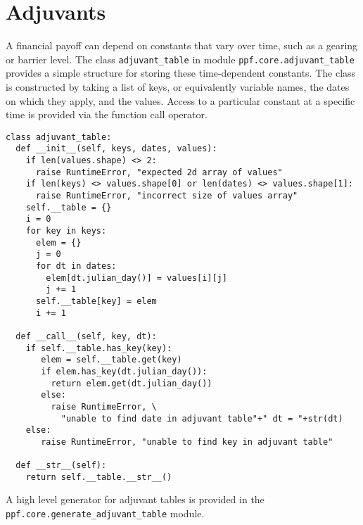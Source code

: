 \section{Adjuvants}\label{sec:adjuvant-tables}
A financial payoff can depend on constants that vary over time, such
as a gearing or barrier level. The class \verb|adjuvant_table| in
module \verb|ppf.core.adjuvant_table| provides a simple structure for
storing these time-dependent constants. The class is constructed by
taking a list of keys, or equivalently variable names, the dates on
which they apply, and the values. Access to a particular constant at a
specific time is provided via the function call operator.
\begin{verbatim}
class adjuvant_table:
  def __init__(self, keys, dates, values):
    if len(values.shape) <> 2:
      raise RuntimeError, "expected 2d array of values"
    if len(keys) <> values.shape[0] or len(dates) <> values.shape[1]:
      raise RuntimeError, "incorrect size of values array"
    self.__table = {}
    i = 0
    for key in keys:
      elem = {}
      j = 0
      for dt in dates:        
        elem[dt.julian_day()] = values[i][j]
        j += 1
      self.__table[key] = elem
      i += 1

  def __call__(self, key, dt):
    if self.__table.has_key(key):
       elem = self.__table.get(key)
       if elem.has_key(dt.julian_day()):
         return elem.get(dt.julian_day())
       else:
         raise RuntimeError, \
           "unable to find date in adjuvant table"+" dt = "+str(dt)
    else:
       raise RuntimeError, "unable to find key in adjuvant table"

  def __str__(self):
    return self.__table.__str__()
\end{verbatim}
A high level generator for adjuvant tables is provided in the \\
\verb|ppf.core.generate_adjuvant_table| module.

